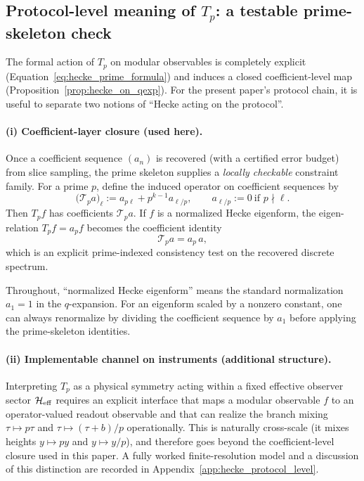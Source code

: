 \subsection{Protocol-level meaning of \texorpdfstring{$T_p$}{Tp}: a testable prime-skeleton check}
\label{sec:hecke_protocol_level}

The formal action of $T_p$ on modular observables is completely explicit (Equation~\eqref{eq:hecke_prime_formula}) and induces a closed coefficient-level map (Proposition~\ref{prop:hecke_on_qexp}).
For the present paper's protocol chain, it is useful to separate two notions of ``Hecke acting on the protocol''.
\par
\paragraph{(i) Coefficient-layer closure (used here).}
Once a coefficient sequence $(a_n)$ is recovered (with a certified error budget) from slice sampling, the prime skeleton supplies a \emph{locally checkable} constraint family.
For a prime $p$, define the induced operator on coefficient sequences by
\begin{equation}
\label{eq:hecke_on_coeff_sequence}
\big(\mathcal{T}_p a\big)_\ell := a_{p\ell}+p^{k-1}a_{\ell/p},
\qquad a_{\ell/p}:=0\ \text{if }p\nmid \ell.
\end{equation}
Then $T_p f$ has coefficients $\mathcal{T}_p a$.
If $f$ is a normalized Hecke eigenform, the eigen-relation $T_p f=a_p f$ becomes the coefficient identity
\begin{equation}
\label{eq:hecke_eigen_coeff_identity}
\mathcal{T}_p a = a_p\,a,
\end{equation}
which is an explicit prime-indexed consistency test on the recovered discrete spectrum.
\begin{remark}
Throughout, ``normalized Hecke eigenform'' means the standard normalization $a_1=1$ in the $q$-expansion. For an eigenform scaled by a nonzero constant, one can always renormalize by dividing the coefficient sequence by $a_1$ before applying the prime-skeleton identities.
\end{remark}
\par
\paragraph{(ii) Implementable channel on instruments (additional structure).}
Interpreting $T_p$ as a physical symmetry acting within a fixed effective observer sector $\mathcal{H}_{\mathrm{eff}}$ requires an explicit interface that maps a modular observable $f$ to an operator-valued readout observable and that can realize the branch mixing $\tau\mapsto p\tau$ and $\tau\mapsto(\tau+b)/p$ operationally.
This is naturally cross-scale (it mixes heights $y\mapsto py$ and $y\mapsto y/p$), and therefore goes beyond the coefficient-level closure used in this paper.
A fully worked finite-resolution model and a discussion of this distinction are recorded in Appendix~\ref{app:hecke_protocol_level}.


